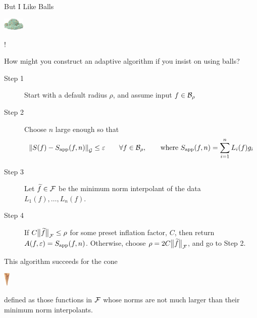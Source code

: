 \documentclass[11pt,compress,xcolor={usenames,dvipsnames},aspectratio=169]{beamer}
\newcommand{\Sapp}{S_{\textup{app}}}
\newcommand{\scoop}[1]{\parbox{#1}{\includegraphics[width=#1]{IceCreamScoop.eps}}\xspace}
\newcommand{\smallscoop}{\scoop{1cm}}
\newcommand{\smallcone}{\parbox{0.65cm}{\includegraphics[width=0.3cm,angle=270]{MediumWaffleCone.eps}}\xspace}
\begin{document}
\begin{frame}{But I Like Balls \smallscoop!}

\vspace{-5ex}
How might you construct an adaptive algorithm if you insist on using \alert{balls}?

\vspace{-2ex}
\begin{description}
    \item[Step 1] Start with a default radius $\rho$, and assume input $f \in \cb_{\rho}$
    
    \item[Step 2] Choose $n$ large enough so that 
    \[
    \norm[\cg]{S(f) - \Sapp(f,n)} \le \varepsilon \qquad \forall f \in \cb_{\rho}, \qquad \text{where } \Sapp(f,n) = \sum_{i=1}^n L_i(f) g_i
    \]
    
    \item[Step 3] Let $\tf \in \cf$ be the \alert{minimum} norm interpolant of the data $L_1(f), \ldots, L_n(f)$.  
    
    \item[Step 4]  If $C\bignorm[\cf]{\tf} \le \rho$ for some preset inflation factor, $C$, then return $A(f,\varepsilon) = \Sapp(f,n)$.  Otherwise, choose $\rho = 2C\bignorm[\cf]{\tf}$, and go to Step 2.
\end{description}

\vspace{-2ex}

This algorithm succeeds for the \alert{cone} \smallcone defined as those functions in $\cf$ whose norms are not much larger than their minimum norm interpolants.
    
\end{frame}
\end{document}

